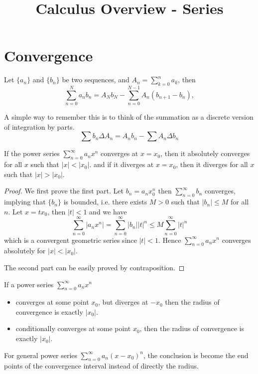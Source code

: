 \documentclass{overview}
\title{Calculus Overview - Series}
\begin{document}
\maketitle

\section{Convergence}

\begin{lemma}
	Let $\{a_n\}$ and $\{b_n\}$ be two sequences, and $A_n = \sum_{k=0}^{n} a_k$, then
	\[
		\sum_{n=0}^{N} a_n b_n = A_N b_N - \sum_{n=0}^{N-1} A_n (b_{n+1} - b_n),
	\]
	\begin{remark}
		A simple way to remember this is to think of the summation as a discrete version
		of integration by parts.
		\[
		\sum b_n \Delta A_n = A_n b_n - \sum A_n \Delta b_n
		\] 
	\end{remark}
\end{lemma}
\begin{theorem}
	If the power series $\sum_{n=0}^{\infty} a_n x^n$ converges at $x = x_0$, then
	it absolutely converges for all $x$ such that $|x| < |x_0|$.
	and if it diverges at $x = x_0$, then it diverges for all $x$ such that $|x| > |x_0|$.
\end{theorem}
\begin{proof}
	We first prove the first part. Let $b_n=a_nx_0^n$ then $\sum_{n=0}^{\infty} b_n$ converges,
		implying that $\{b_n\}$ is bounded, i.e. there exists $M>0$ such that $|b_n|\leq M$ for all $n$.
	Let $x=tx_0$, then $|t|<1$ and we have
	\[
		\sum_{n=0}^{\infty} |a_n x^n| = \sum_{n=0}^{\infty} |b_n| |t|^n 
		\leq M \sum_{n=0}^{\infty} |t|^n
	\]
	which is a convergent geometric series since $|t|<1$. 
	Hence $\sum_{n=0}^{\infty} a_n x^n$ converges absolutely for $|x|<|x_0|$.
	
	The second part can be easily proved by contraposition.
\end{proof}

\begin{theorem}[Inference]
	If a power series $\sum_{n=0}^{\infty} a_n x^n$
	\begin{itemize}
	\item converges at some point $x_0$, but
	diverges at $-x_0$ then the radius of convergence is exactly $|x_0|$.
	\item conditionally converges at some point
	$x_0$, then the radius of convergence is exactly $|x_0|$.
	\end{itemize}
	\begin{remark}
		For general power series $\sum_{n=0}^{\infty} a_n (x-x_0)^n$, the conclusion
		is become the end points of the convergence interval instead of directly the radius.
	\end{remark}
\end{theorem}
\end{document}
